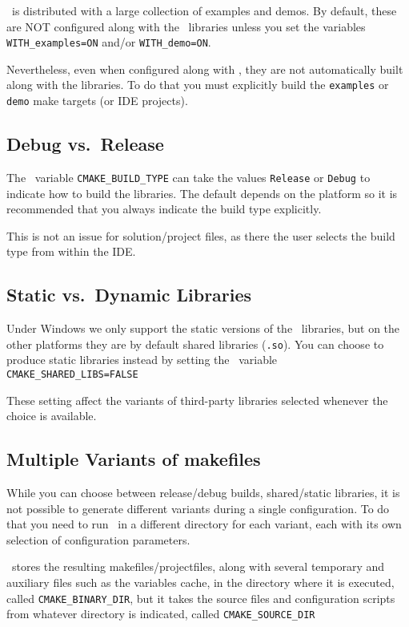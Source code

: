 \cgal\ is distributed with a large collection of examples and demos. By default, these are NOT configured along with
the \cgal\ libraries unless you set the variables {\tt WITH\_examples=ON} and/or {\tt WITH\_demo=ON}.

Nevertheless, even when configured along with \cgal, they are not automatically built along with the libraries.
To do that you must explicitly build the \texttt{examples} or \texttt{demo} make targets (or IDE projects).

\subsection{Debug vs.\ Release}

The \cmake\ variable \texttt{CMAKE\_BUILD\_TYPE} can take the values \texttt{Release} or \texttt{Debug} to indicate how to build
the libraries. The default depends on the platform so it is recommended that you always indicate the build type explicitly.

This is not an issue for solution/project files, as there the user selects the build type from within the IDE.

\subsection{Static vs.\ Dynamic Libraries }

Under Windows we only support  the static versions of the \cgal\ libraries, but on the other platforms
they are by default shared libraries ({\tt .so}).
You can choose to produce static libraries instead by setting the \cmake\ variable {\tt CMAKE\_SHARED\_LIBS=FALSE} 

These setting affect the variants of third-party libraries selected whenever the choice is available.

\subsection{Multiple Variants of makefiles}\label{sec:cmake-out-of-source}

While you can choose between release/debug builds, shared/static libraries,
it is not possible to generate different variants during a single configuration. To do that you need to run \cmake\ in a 
different directory for each variant, each with its own selection of configuration parameters.

\cmake\ stores the resulting makefiles/projectfiles, along with several temporary and auxiliary files such
as the variables cache, in the directory where it is executed, called \texttt{CMAKE\_BINARY\_DIR}, but it
takes the source files and configuration scripts from whatever directory is indicated, called
\texttt{CMAKE\_SOURCE\_DIR} 

